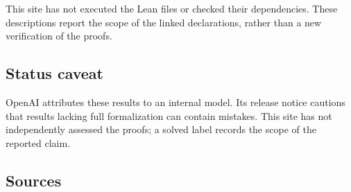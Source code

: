 \documentclass[11pt]{article}
\begin{document}
This site has not executed the Lean files or checked their dependencies. These descriptions report the scope of the linked declarations, rather than a new verification of the proofs.

\subsection{Status caveat}
OpenAI attributes these results to an internal model. Its release notice cautions that results lacking full formalization can contain mistakes. This site has not independently assessed the proofs; a solved label records the scope of the reported claim.

\subsection{Sources}
\end{document}
